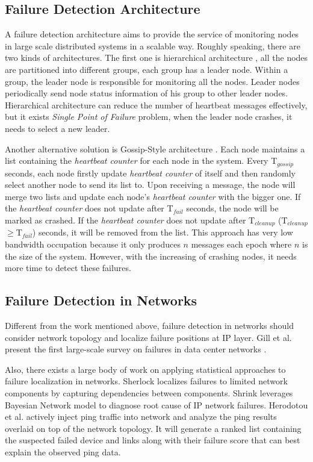 \documentclass{sig-alternate-05-2015}
\begin{document}
\subsection{Failure Detection Architecture}
A failure detection architecture aims to provide the service of monitoring nodes in large scale distributed systems in a scalable way.
Roughly speaking, there are two kinds of architectures. The first one is hierarchical architecture \cite{felber1999failure}, all the nodes are partitioned into different groups, each group has a leader node. Within a group, the leader node is responsible for monitoring all the nodes. Leader nodes periodically send node status information of his group to other leader nodes. Hierarchical architecture can reduce the number of heartbeat messages effectively, but it exists \textit{Single Point of Failure} problem, when the leader node crashes, it needs to select a new leader.

Another alternative solution is Gossip-Style architecture \cite{van1998gossip}. Each node maintains a list containing the \textit{heartbeat counter} for each node in the system. Every T$_{gossip}$ seconds, each node firstly update \textit{heartbeat counter} of itself and then randomly select another node to send its list to. Upon receiving a message, the node will merge two lists and update each node's \textit{heartbeat counter} with the bigger one. If the \textit{heartbeat counter} does not update after T$_{fail}$ seconds, the node will be marked as crashed. If the \textit{heartbeat counter} does not update after T$_{cleanup}$ (T$_{cleanup}$
$\ge$T$_{fail}$) seconds, it will be removed from the list. This approach has very low bandwidth occupation because it only produces $n$ messages each epoch where $n$ is the size of the system. However, with the increasing of crashing nodes, it needs more time to detect these failures.

\subsection{Failure Detection in Networks}
Different from the work mentioned above, failure detection in networks should consider network topology and localize failure positions at IP layer. Gill et al. present the first large-scale survey on failures in data center networks \cite{gill2011understanding}.

Also, there exists a large body of work on applying statistical approaches to failure localization in networks. Sherlock \cite{bahl2007towards} localizes failures to limited network components by capturing dependencies between components. Shrink \cite{kandula2005shrink} leverages Bayesian Network model to diagnose root cause of IP network failures. Herodotou et al. \cite{herodotou2014scalable} actively inject ping traffic into network and analyze the ping results overlaid on top of the network topology. It will generate a ranked list containing the suspected failed device and links along with their failure score that can best explain the observed ping data.
\end{document}
